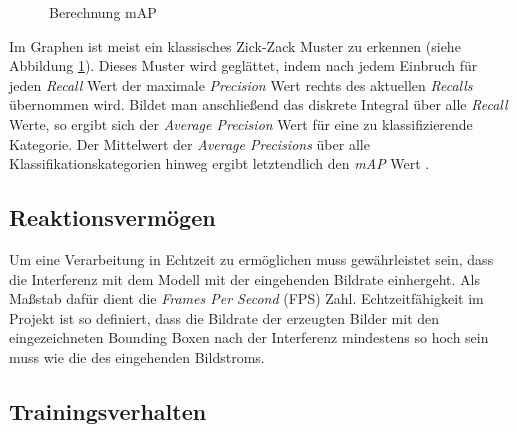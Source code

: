 \begin{figure}[ht]
	\caption[Berechnung mAP]{Berechnung mAP \cite{JonathanHui.20180307}} 
	\label{map}
\end{figure} 

Im Graphen ist meist ein klassisches \glqq Zick-Zack\grqq{} Muster zu erkennen (siehe Abbildung \ref{map}). Dieses Muster wird geglättet, indem nach jedem Einbruch für jeden \textit{Recall} Wert der maximale \textit{Precision} Wert rechts des aktuellen \textit{Recalls} übernommen wird. Bildet man anschließend das diskrete Integral über alle \textit{Recall} Werte, so ergibt sich der \textit{Average Precision} Wert für eine zu klassifizierende Kategorie. Der Mittelwert der  \textit{Average Precisions} über alle Klassifikationskategorien hinweg ergibt letztendlich den \textit{mAP} Wert \cite{JonathanHui.20180307}. 

\subsection*{Reaktionsvermögen}

Um eine Verarbeitung in Echtzeit zu ermöglichen muss gewährleistet sein, dass die Interferenz mit dem Modell mit der eingehenden Bildrate einhergeht. Als Maßstab dafür dient die \textit{Frames Per Second} (FPS) Zahl. Echtzeitfähigkeit im Projekt ist so definiert, dass die Bildrate der erzeugten Bilder mit den eingezeichneten Bounding Boxen nach der Interferenz mindestens so hoch sein muss wie die des eingehenden Bildstroms. 

\subsection*{Trainingsverhalten}

